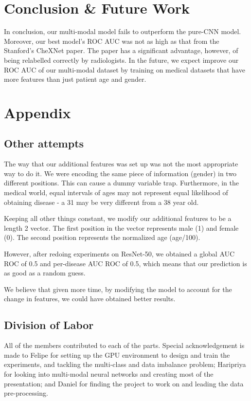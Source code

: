\documentclass[10pt,letterpaper]{article}
\begin{document}
\section{Conclusion \& Future Work}

In conclusion, our multi-modal model fails to outperform the pure-CNN model. Moreover, our best model's ROC AUC was not as high as that from the Stanford's CheXNet paper.
The paper has a significant advantage, however, of being relabelled correctly by radiologists. In the future, we expect improve our ROC AUC of our multi-modal dataset by training on medical datasets that have more features than just patient age and gender.

\section{Appendix}

\subsection{Other attempts}

The way that our additional features was set up was not the most appropriate way to do it. We were encoding the same piece of information (gender) in two different positions. This can cause a dummy variable trap. Furthermore, in the medical world, equal intervals of ages may not represent equal likelihood of obtaining disease - a 31 may be very different from a 38 year old. 

Keeping all other things constant, we modify our additional features to be a length 2 vector. The
first position in the vector represents male (1) and female (0). The second position represents the normalized age (age/100). 

However, after redoing experiments on ResNet-50, we obtained a global AUC ROC of 0.5 and per-disease AUC ROC of 0.5, which means that our prediction is as good as a random guess.

We believe that given more time, by modifying the model to account for the change in features, we could have obtained better results. 

\subsection{Division of Labor}

All of the members contributed to each of the parts. Special acknowledgement is made to Felipe for setting up the GPU environment to design and train the experiments, and tackling the multi-class and data imbalance problem; Haripriya for looking into multi-modal neural networks and creating most of the presentation; and Daniel for finding the project to work on and leading the data pre-processing.




\end{document}
